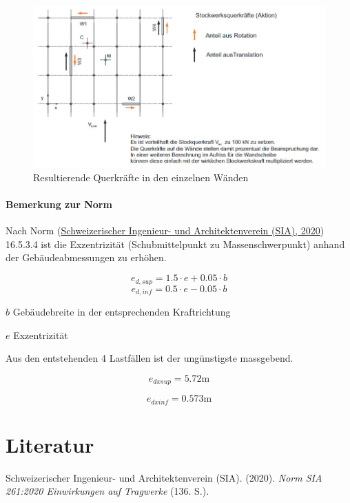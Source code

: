 \documentclass[
  letterpaper,
  DIV=11]{scrreprt}
\newlength{\cslhangindent}
\newlength{\cslentryspacingunit} %
\newenvironment{CSLReferences}[2] %
 {%
  \setlength{\parindent}{0pt}
  \ifodd #1
  \let\oldpar\par
  \def\par{\hangindent=\cslhangindent\oldpar}
  \fi
  \setlength{\parskip}{#2\cslentryspacingunit}
 }%
 {}
\begin{document}
\begin{figure}[H]

{\centering \includegraphics{bilder/ekv3.jpg}

}

\caption{\label{fig-V_waende}Resultierende Querkräfte in den einzelnen
Wänden}

\end{figure}

\hypertarget{bemerkung-zur-norm}{%
\subsubsection{Bemerkung zur Norm}\label{bemerkung-zur-norm}}

Nach Norm (\protect\hyperlink{ref-SIA261_2020}{Schweizerischer
Ingenieur- und Architektenverein (SIA), 2020}) 16.5.3.4 ist die
Exzentrizität (Schubmittelpunkt zu Massenschwerpunkt) anhand der
Gebäudeabmessungen zu erhöhen.

\[e_{d,sup} = 1.5\cdot e+0.05\cdot b\]
\[e_{d,inf} = 0.5\cdot e-0.05\cdot b\]

\(b\) Gebäudebreite in der entsprechenden Kraftrichtung

\(e\) Exzentrizität

Aus den entstehenden 4 Lastfällen ist der ungünstigste massgebend.

\begin{equation*}e_{dxsup} = 5.72 \text{m}\end{equation*}

\begin{equation*}e_{dxinf} = 0.573 \text{m}\end{equation*}


\hypertarget{literatur}{%
\chapter*{Literatur}\label{literatur}}


\hypertarget{refs}{}
\begin{CSLReferences}{1}{0}
\leavevmode{}%
Schweizerischer Ingenieur- und Architektenverein (SIA). (2020).
\emph{{Norm SIA 261:2020 Einwirkungen auf Tragwerke }} (136. S.).

\end{CSLReferences}
\end{document}
